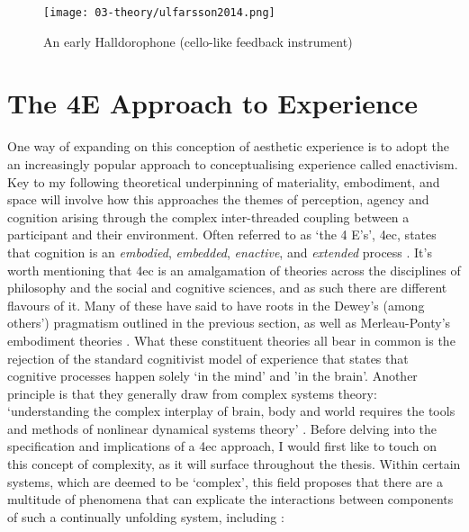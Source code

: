 \begin{figure}[h]
    \centering
    \texttt{[image: 03-theory/ulfarsson2014.png]}
    \captionsetup{justification=centering,margin=1.5cm}
    \caption{An early Halldorophone (cello-like feedback instrument) \citep[from][]{ulfarsson2014}}\label{fig: ulfarsson2014}
\end{figure}

\section{The 4E Approach to Experience}\label{sec: theory-4e}
One way of expanding on this conception of aesthetic experience is to adopt the an increasingly popular approach to conceptualising experience called enactivism. Key to my following theoretical underpinning of materiality, embodiment, and space will involve how this approaches the themes of perception, agency and cognition arising through the complex inter-threaded coupling between a participant and their environment. Often referred to as `the 4 E's', \gls{4ec}, states that cognition is an \textit{embodied}, \textit{embedded}, \textit{enactive}, and \textit{extended} process \citep{gallagher2017}. It's worth mentioning that \gls{4ec} is an amalgamation of theories across the disciplines of philosophy and the social and cognitive sciences, and as such there are different flavours of it. Many of these have said to have roots in the Dewey's (among others') pragmatism outlined in the previous section, as well as Merleau-Ponty's embodiment theories \citep{zavota2016}. What these constituent theories all bear in common is the rejection of the standard cognitivist model of experience that states that cognitive processes happen solely `in the mind' and 'in the brain'. Another principle is that they generally draw from complex systems theory: `understanding the complex interplay of brain, body and world requires the tools and methods of nonlinear dynamical systems theory' \citep{clark1999}. Before delving into the specification and implications of a \gls{4ec} approach, I would first like to touch on this concept of complexity, as it will surface throughout the thesis. Within certain systems, which are deemed to be `complex', this field proposes that there are a multitude of phenomena that can explicate the interactions between components of such a continually unfolding system, including \citep{dedomenico2019}:
